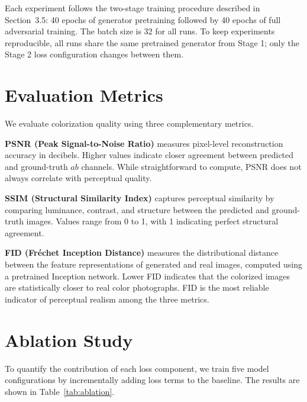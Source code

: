 \documentclass[12pt, a4paper, oneside]{report}
\begin{document}
Each experiment follows the two-stage training procedure described in Section~3.5:
40 epochs of generator pretraining followed by 40 epochs of full adversarial
training. The batch size is 32 for all runs. To keep experiments reproducible,
all runs share the same pretrained generator from Stage 1; only the Stage 2 loss
configuration changes between them.

\section{Evaluation Metrics}

We evaluate colorization quality using three complementary metrics.

\textbf{PSNR (Peak Signal-to-Noise Ratio)} measures pixel-level reconstruction
accuracy in decibels. Higher values indicate closer agreement between predicted and
ground-truth $ab$ channels. While straightforward to compute, PSNR does not always
correlate with perceptual quality.

\textbf{SSIM (Structural Similarity Index)} captures perceptual similarity by
comparing luminance, contrast, and structure between the predicted and ground-truth
images. Values range from 0 to 1, with 1 indicating perfect structural agreement.

\textbf{FID (Fr\'{e}chet Inception Distance)} \cite{heusel2017gans} measures the
distributional distance between the feature representations of generated and real
images, computed using a pretrained Inception network. Lower FID indicates that the
colorized images are statistically closer to real color photographs. FID is the most
reliable indicator of perceptual realism among the three metrics.

\section{Ablation Study}

To quantify the contribution of each loss component, we train five model
configurations by incrementally adding loss terms to the baseline. The results are
shown in Table~\ref{tab:ablation}.
\end{document}
